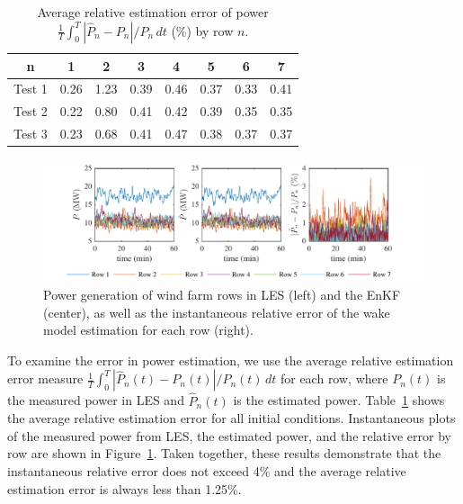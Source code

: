 \begin{table}[b]
\caption{Average relative estimation error of power $\frac{1}{T}\int_0^T |\hat{P}_n - P_n|/P_n \, dt$ (\%) by row $n$.}
\label{tab:P_error}
\begin{center}
\begin{tabular}{c c c c c c c c}
\hline
n & 1 & 2 & 3 & 4 & 5 & 6 & 7 \\
\hline
Test 1 & 0.26 & 1.23 & 0.39 & 0.46 & 0.37 & 0.33 & 0.41 \\
Test 2 & 0.22 & 0.80 & 0.41 & 0.42 & 0.39 & 0.35 & 0.35 \\
Test 3 & 0.23 & 0.68 & 0.41 & 0.47 & 0.38 & 0.37 & 0.37 \\
\hline
\end{tabular}
\end{center}
\end{table}

\begin{figure}
\centering
\includegraphics{./fig/r1-power.pdf}
\caption{Power generation of wind farm rows in LES (left) and the EnKF (center), as well as the instantaneous relative error of the wake model estimation for each row (right).}
\label{fig:r1-power}
\end{figure}

To examine the error in power estimation, we use the average relative estimation error measure $\frac{1}{T}\int_0^T |\hat{P}_n(t) - P_n(t)|/P_n(t) \, dt$ for each row, where $P_n(t)$ is the measured power in LES and $\hat{P}_n(t)$ is the estimated power. Table~\ref{tab:P_error} shows the average relative estimation error for all initial conditions. Instantaneous plots of the measured power from LES, the estimated power, and the relative error by row are shown in Figure~\ref{fig:r1-power}. Taken together, these results demonstrate that the instantaneous relative error does not exceed 4\% and the average relative estimation error is always less than 1.25\%.

